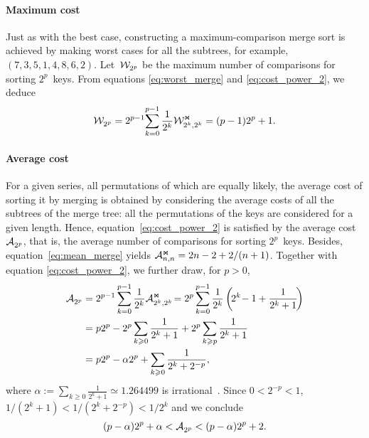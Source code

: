 \paragraph{Maximum cost}

Just as with the best case, constructing a maximum-comparison
merge sort is achieved by making worst cases for all the subtrees, for
example, \((7,3,5,1,4,8,6,2)\). Let~\(\mathcal{W}_{2^p}^{}\) be the maximum
number of comparisons for sorting \(2^p\)~keys. From equations
\eqref{eq:worst_merge} and \eqref{eq:cost_power_2}, we deduce
\begin{equation}
\abovedisplayskip=0pt
\belowdisplayskip=0pt
\W{}{2^p}
  = 2^{p-1}\!\sum_{k=0}^{p-1}{\frac{1}{2^k}\W{\Join}{2^k,2^k}}
  = (p-1)2^p + 1.
\label{eq:worst_power}
\end{equation}

\paragraph{Average cost}

For a given series, all permutations of which are equally likely, the
average cost of sorting it by merging is obtained by considering the
average costs of all the subtrees of the merge tree: all the
permutations of the keys are considered for a given length. Hence,
equation~\eqref{eq:cost_power_2} is satisfied by the average cost
\(\mathcal{A}_{2^p}^{}\), that is, the average number of comparisons for sorting
\(2^p\)~keys. Besides, equation~\eqref{eq:mean_merge} yields
\(\mathcal{A}_{n,n}^{\Join} = 2n - 2 + 2/(n+1)\). Together with equation
\eqref{eq:cost_power_2}, we further draw, for \(p > 0\),
\begin{align}
\abovedisplayskip=0pt
\belowdisplayskip=0pt
\M{}{2^p}
  &= 2^{p-1}\sum_{k=0}^{p-1}{\frac{1}{2^k}\M{\Join}{2^k,2^k}}\!
  = 2^p\sum_{k=0}^{p-1}{\frac{1}{2^k}\left(\!2^k\! - 1 + \frac{1}{2^k +
      1}\!\right)}\notag\\
  &= p2^p - 2^p \sum_{k \geqslant 0}\frac{1}{2^k+1}
     + 2^p \sum_{k \geqslant p}\frac{1}{2^k+1}\notag\\
  &= p2^p - \alpha 2^p + \sum_{k \geqslant 0}\frac{1}{2^{k}+2^{-p}},
\label{eq:Mjoin}
\end{align}
where \(\alpha := \sum_{k \geqslant 0}\frac{1}{2^k+1} \simeq
1.264499\) is irrational~\cite{Borwein:1992}. Since \(0 < 2^{-p} <
1\),  \(1/(2^k + 1) < 1/(2^k+2^{-p}) < 1/2^k\) and we conclude
\begin{equation}
(p - \alpha)2^p + \alpha < \mathcal{A}_{2^p}^{} < (p-\alpha)2^p + 2.
\label{ineq:M_join}
\end{equation}

